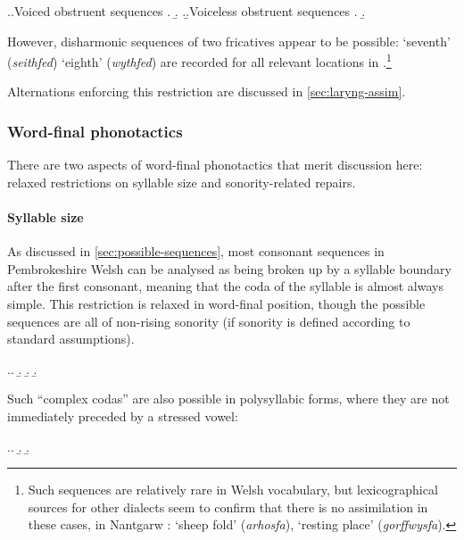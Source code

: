 \ex.\a.Voiced obstruent sequences
\a.
\b.
\z.\b.Voiceless obstruent sequences
\a.
\b.

However, disharmonic sequences of two fricatives appear to be possible: \ipa{[ˈseiθved]} `seventh' (\emph{seithfed}) \ipa{[ˈʊiθved]} `eighth' (\emph{wythfed}) are recorded for all relevant locations in \citet[\emph{sub vocibus}]{thomas00:_welsh}.\footnote{Such sequences are relatively rare in Welsh vocabulary, but lexicographical sources for other dialects seem to confirm that there is no assimilation in these cases, \eg in Nantgarw \citep{thomas93:_tafod_nantg}: \ipa{[aˈrosva]} `sheep fold' (\emph{arhosfa}), \ipa{[ɡorˈfʊisva]} `resting place' (\emph{gorffwysfa}).}

Alternations enforcing this restriction are discussed in \cref{sec:laryng-assim}.

\subsubsection{Word-final phonotactics}
\label{sec:word-final-phon}

There are two aspects of word-final phonotactics that merit discussion here: relaxed restrictions on syllable size and sonority-related repairs.

\paragraph{Syllable size}
\label{sec:syllable-size}

As discussed in \cref{sec:possible-sequences}, most consonant sequences in Pembrokeshire Welsh can be analysed as being broken up by a syllable boundary after the first consonant, meaning that the coda of the syllable is almost always simple. This restriction is relaxed in word-final position, though the possible sequences are all of non-rising sonority (if sonority is defined according to standard assumptions).

\ex.\label{ex:complex-codas}\a.
\b.
\b.
\b.

Such \enquote{complex codas} are also possible in polysyllabic forms, where they are not immediately preceded by a stressed vowel:

\ex.\a.
\b.
\b.

